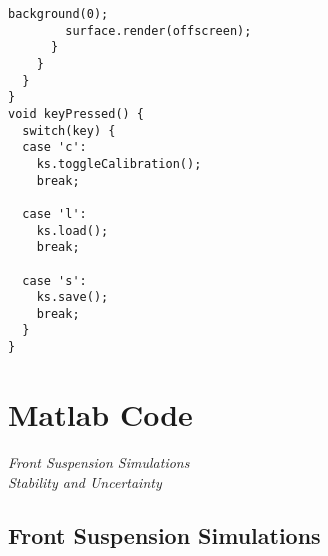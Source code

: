 \begin{lstlisting}[style=codejava]
        background(0);
        surface.render(offscreen);
      }
    }
  }
}
void keyPressed() {
  switch(key) {
  case 'c':
    ks.toggleCalibration();
    break;

  case 'l':
    ks.load();
    break;

  case 's':
    ks.save();
    break;
  }
}
\end{lstlisting}

\chapter{Matlab Code}

\textit{Front Suspension Simulations} \\[10pt]
\textit{Stability and Uncertainty} \\[10pt]

\newpage
\section{Front Suspension Simulations}

